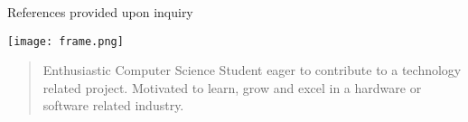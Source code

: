 \documentclass[10pt,a4paper,ragged2e,withhyper]{altacv}
\begin{document}
\begin{paracol}{2}
            References provided upon inquiry
        
        \parskip 12pt
        \texttt{[image: frame.png]}
        
        \parskip 0pt
        
        
        
        
        \newpage
        
        \switchcolumn
        
            \begin{quote}
                Enthusiastic Computer Science Student eager to contribute to a technology related project. Motivated to learn, grow and excel in a hardware or software related industry.
            \end{quote}
        

\end{paracol}
\end{document}
